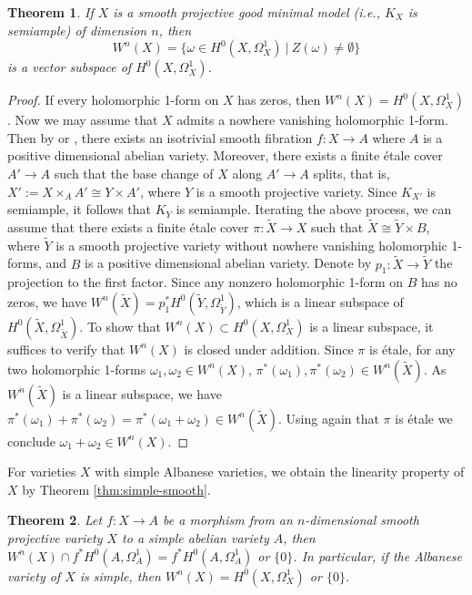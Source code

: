\documentclass[a4paper,12pt,reqno]{amsart}
\newtheorem{theorem}{Theorem}[section]
\theoremstyle{question}
\theoremstyle{definition}
\theoremstyle{remark}
\theoremstyle{cited}
\theoremstyle{citeddef}
\let\tilde\widetilde
\begin{document}
\begin{theorem}\label{thm:linearity-zeros-gmm}
    If $X$ is a smooth projective good minimal model (i.e., $K_{X}$ is semiample) of dimension $n$, then $$W^{n}(X)=\{\omega\in H^{0}(X,\Omega_{X}^{1})~|~Z(\omega)\neq \emptyset\}$$ is a  vector subspace of $H^{0}(X,\Omega_{X}^{1})$. 
\end{theorem}
\begin{proof}
    If every holomorphic 1-form on $X$ has zeros, then $W^{n}(X)=H^{0}(X,\Omega_{X}^{1})$. Now we may assume that $X$ admits a nowhere vanishing holomorphic 1-form. Then by \cite{Chu24} or \cite{HWZ26}, there exists an isotrivial smooth fibration $f\colon X\to A$ where $A$ is a positive dimensional abelian variety. Moreover, there exists a finite 
    \'etale cover $A'\to A$ such that the base change of $X$ along $A'\to A$ splits, that is, $X':=X\times_{A}A'\cong Y\times A'$, where $Y$ is a smooth projective variety. Since $K_{X'}$ is semiample, it follows that $K_{Y}$ is semiample. 
    Iterating the above process, we can assume that there exists a finite \'etale cover $\pi:\tilde{X}\to X$ such that $\tilde{X}\cong \tilde{Y}\times B$, where $\tilde{Y}$ is a smooth projective variety without nowhere vanishing holomorphic 1-forms, and $B$ is a positive dimensional abelian variety. Denote by $p_{1}:\tilde{X}\to \tilde{Y}$ the projection to the first factor. Since any nonzero holomorphic 1-form on $B$ has no zeros, we have $W^{n}(\tilde{X})=p_{1}^{*}H^{0}(\tilde{Y},\Omega_{\tilde{Y}}^{1})$, which is a linear subspace of $H^{0}(\tilde{X},\Omega_{\tilde{X}}^{1})$. To show that $W^{n}(X)\subset H^{0}(X,\Omega_{X}^{1})$ is a linear subspace, it suffices to verify that $W^{n}(X)$ is closed under addition. Since $\pi$ is \'etale, for any two holomorphic 1-forms $\omega_{1},\omega_{2}\in W^{n}(X)$, $\pi^{*}(\omega_{1}),\pi^{*}(\omega_{2})\in W^{n}(\tilde{X})$. As $W^{n}(\tilde{X})$ is a linear subspace, we have $\pi^{*}(\omega_{1})+\pi^{*}(\omega_{2})=\pi^{*}(\omega_{1}+\omega_{2})\in W^{n}(\tilde{X})$. Using again that $\pi$ is \'etale we conclude $\omega_{1}+\omega_{2}\in W^{n}(X)$.   
\end{proof}

For varieties $X$ with simple Albanese varieties, we obtain the linearity property of $X$ by Theorem \ref{thm:simple-smooth}.

\begin{theorem}\label{prop:simple-linear}
  Let $f\colon X\to A$ be a morphism from an $n$-dimensional smooth projective variety $X$ to a simple abelian variety $A$,  then $W^n(X)\cap f^*H^0(A,\Omega_A^1)=f^*H^0(A,\Omega_A^1)$ or $\{0\}$. In particular, if the Albanese variety of $X$ is simple, then $W^n(X)=H^0(X, \Omega_X^1)$ or $\{0\}$. 
\end{theorem}
\end{document}
